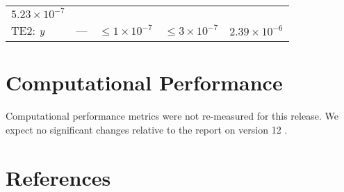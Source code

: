 \documentclass[DM,lsstdraft,toc]{lsstdoc}
\begin{document}
\begin{longtable}[]{@{}lllll@{}}
\begin{minipage}[t]{0.22\columnwidth}
\(5.23\times 10^{-7}\)\strut
\end{minipage}\tabularnewline
\begin{minipage}[t]{0.13\columnwidth}\raggedright\strut
TE2: \emph{y}\strut
\end{minipage} & \begin{minipage}[t]{0.05\columnwidth}\raggedright\strut
---\strut
\end{minipage} & \begin{minipage}[t]{0.24\columnwidth}\raggedright\strut
\(\leq 1\times 10^{-7}\)\strut
\end{minipage} & \begin{minipage}[t]{0.21\columnwidth}\raggedright\strut
\(\leq 3\times 10^{-7}\)\strut
\end{minipage} & \begin{minipage}[t]{0.22\columnwidth}\raggedright\strut
\(2.39\times 10^{-6}\)\strut
\end{minipage}\tabularnewline
\bottomrule
\end{longtable}

\section{Computational Performance}\label{computational-performance}

Computational performance metrics were not re-measured for this release.
We expect no significant changes relative to the
report on version 12 .

\appendix
\newpage
\section{References\label{sect:references}}
\renewcommand{\refname}{}


%
\end{document}
